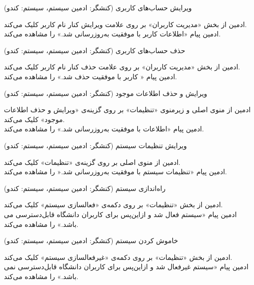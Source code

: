 \documentclass{report}
\begin{document}
\textbf{}
ویرایش حساب‌های کاربری (کنشگر: ادمین سیستم، سیستم: کندو)
\begin{addmargin}[.84cm]{0cm}
ادمین از بخش «مدیریت کاربران» بر روی علامت ویرایش کنار نام کاربر کلیک می‌کند.\\
ادمین پیام «اطلاعات کاربر با موفقیت به‌روزرسانی شد.» را مشاهده می‌کند.
\end{addmargin}

\textbf{}
حذف حساب‌های کاربری (کنشگر: ادمین سیستم، سیستم: کندو)
\begin{addmargin}[.84cm]{0cm}
ادمین از بخش «مدیریت کاربران» بر روی علامت حذف کنار نام کاربر کلیک می‌کند.\\
ادمین پیام « کاربر با موفقیت حذف شد.» را مشاهده می‌کند.
\end{addmargin}

\textbf{}
ویرایش و حذف اطلاعات موجود (کنشگر: ادمین سیستم، سیستم: کندو)
\begin{addmargin}[.84cm]{0cm}
ادمین از منوی اصلی و زیرمنوی «تنظیمات» بر روی گزینه‌ی «ویرایش و حذف اطلاعات موجود» کلیک می‌کند.\\
ادمین پیام «اطلاعات با موفقیت به‌روزرسانی شد.» را مشاهده می‌کند.
\end{addmargin}

\textbf{}
ویرایش تنظیمات سیستم (کنشگر: ادمین سیستم، سیستم: کندو)\begin{addmargin}[.84cm]{0cm}
ادمین از منوی اصلی بر روی گزینه‌ی «تنظیمات» کلیک می‌کند.\\
ادمین پیام «تنظیمات سیستم با موفقیت به‌روزرسانی شد.« را مشاهده می‌کند.
\end{addmargin}

\textbf{}
راه‌اندازی سیستم (کنشگر: ادمین سیستم، سیستم: کندو)
\begin{addmargin}[.84cm]{0cm}
ادمین از بخش «تنظیمات» بر روی دکمه‌ی «فعالسازی سیستم» کلیک می‌کند.\\
ادمین پیام «سیستم فعال شد و از‌این‌پس برای کاربران دانشگاه قابل‌دسترسی می باشد.» را مشاهده می‌کند.
\end{addmargin}

\textbf{}
خاموش کردن سیستم (کنشگر: ادمین سیستم، سیستم: کندو)\begin{addmargin}[.84cm]{0cm}
ادمین از بخش «تنظیمات» بر روی دکمه‌ی «غیرفعالسازی سیستم» کلیک می‌کند.\\
ادمین پیام «سیستم غیرفعال شد و از‌این‌پس برای کاربران دانشگاه قابل‌دسترسی نمی باشد.» را مشاهده می‌کند.
\end{addmargin}
\end{document}
